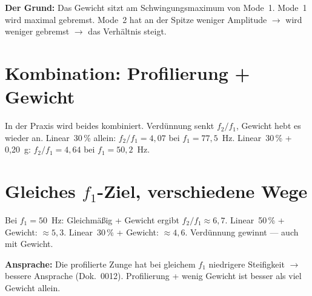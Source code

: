 \documentclass[11pt,a4paper]{article}
\begin{document}
\begin{center}
\end{center}

\begin{tcolorbox}[colframe=keygreen, colback=green!5!white]
\textbf{Der Grund:} Das Gewicht sitzt am Schwingungsmaximum von Mode~1.
Mode~1 wird maximal gebremst. Mode~2 hat an der Spitze weniger Amplitude
$\to$ wird weniger gebremst $\to$ das Verhältnis steigt.
\end{tcolorbox}

\section{Kombination: Profilierung + Gewicht}

In der Praxis wird beides kombiniert. Verdünnung senkt $f_2/f_1$,
Gewicht hebt es wieder an. Linear~30\,\% allein: $f_2/f_1 = 4{,}07$
bei $f_1 = 77{,}5$~Hz. Linear~30\,\% + 0,20~g: $f_2/f_1 = 4{,}64$
bei $f_1 = 50{,}2$~Hz.

\section{Gleiches $f_1$-Ziel, verschiedene Wege}

Bei $f_1 = 50$~Hz: Gleichmäßig + Gewicht ergibt $f_2/f_1 \approx 6{,}7$.
Linear~50\,\% + Gewicht: $\approx 5{,}3$. Linear~30\,\% + Gewicht:
$\approx 4{,}6$. Verdünnung gewinnt --- auch mit Gewicht.

\begin{tcolorbox}[colframe=keygreen, colback=green!5!white]
\textbf{Ansprache:} Die profilierte Zunge hat bei gleichem $f_1$
niedrigere Steifigkeit $\to$ bessere Ansprache (Dok.~0012).
Profilierung + wenig Gewicht ist besser als viel Gewicht allein.
\end{tcolorbox}
\end{document}

